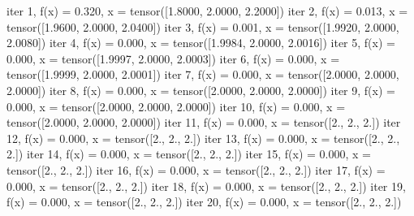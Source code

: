 \documentclass[letterpaper,10pt,english]{sphinxmanual}
\begin{document}
\begin{sphinxVerbatim}[commandchars=\\\{\}]
  \PYG{p}{[}  \PYG{p}{]}
                   
  
    
     
          
      
      
\end{sphinxVerbatim}

\begin{sphinxVerbatim}[commandchars=\\\{\}]
iter  1, f(x) = 0.320, x = tensor([1.8000, 2.0000, 2.2000])
iter  2, f(x) = 0.013, x = tensor([1.9600, 2.0000, 2.0400])
iter  3, f(x) = 0.001, x = tensor([1.9920, 2.0000, 2.0080])
iter  4, f(x) = 0.000, x = tensor([1.9984, 2.0000, 2.0016])
iter  5, f(x) = 0.000, x = tensor([1.9997, 2.0000, 2.0003])
iter  6, f(x) = 0.000, x = tensor([1.9999, 2.0000, 2.0001])
iter  7, f(x) = 0.000, x = tensor([2.0000, 2.0000, 2.0000])
iter  8, f(x) = 0.000, x = tensor([2.0000, 2.0000, 2.0000])
iter  9, f(x) = 0.000, x = tensor([2.0000, 2.0000, 2.0000])
iter 10, f(x) = 0.000, x = tensor([2.0000, 2.0000, 2.0000])
iter 11, f(x) = 0.000, x = tensor([2., 2., 2.])
iter 12, f(x) = 0.000, x = tensor([2., 2., 2.])
iter 13, f(x) = 0.000, x = tensor([2., 2., 2.])
iter 14, f(x) = 0.000, x = tensor([2., 2., 2.])
iter 15, f(x) = 0.000, x = tensor([2., 2., 2.])
iter 16, f(x) = 0.000, x = tensor([2., 2., 2.])
iter 17, f(x) = 0.000, x = tensor([2., 2., 2.])
iter 18, f(x) = 0.000, x = tensor([2., 2., 2.])
iter 19, f(x) = 0.000, x = tensor([2., 2., 2.])
iter 20, f(x) = 0.000, x = tensor([2., 2., 2.])
\end{sphinxVerbatim}
\end{document}
